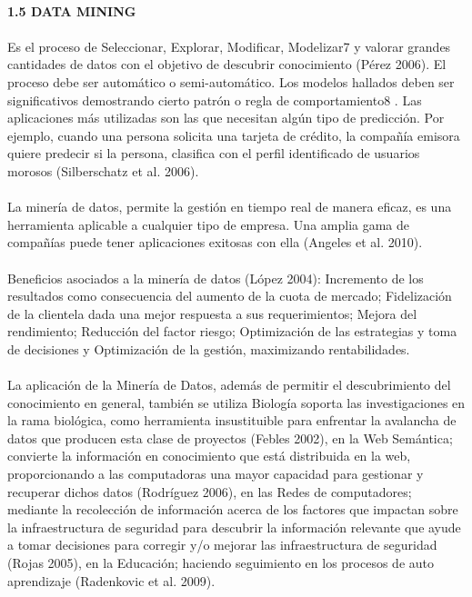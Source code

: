 \begin{flushleft}
\textbf{}\\
\textbf{1.5 DATA MINING }\\
\textbf{}\\
Es el proceso de Seleccionar, Explorar, Modificar, Modelizar7 y valorar grandes cantidades de datos con el objetivo de descubrir conocimiento (Pérez 2006). El proceso debe ser automático o semi-automático. Los modelos hallados deben ser significativos demostrando cierto patrón o regla de comportamiento8 . Las aplicaciones más utilizadas son las que necesitan algún tipo de predicción. Por ejemplo, cuando una persona solicita una tarjeta de crédito, la compañía emisora quiere predecir si la persona, clasifica con el perfil identificado de usuarios morosos (Silberschatz et al. 2006). \textbf{}\\
\textbf{}\\
La minería de datos, permite la gestión en tiempo real de manera eficaz, es una herramienta aplicable a cualquier tipo de empresa. Una amplia gama de compañías puede tener aplicaciones exitosas con ella (Angeles et al. 2010). \textbf{}\\
\textbf{}\\
Beneficios asociados a la minería de datos (López 2004): Incremento de los resultados como consecuencia del aumento de la cuota de mercado; Fidelización de la clientela dada una mejor respuesta a sus requerimientos; Mejora del rendimiento; Reducción del factor riesgo; Optimización de las estrategias y toma de decisiones y Optimización de la gestión, maximizando rentabilidades. \textbf{}\\
\textbf{}\\
La aplicación de la Minería de Datos, además de permitir el descubrimiento del conocimiento en general, también se utiliza Biología soporta las investigaciones en la rama biológica, como herramienta insustituible para enfrentar la avalancha de datos que producen esta clase de proyectos (Febles 2002), en la Web Semántica; convierte la información en conocimiento que está distribuida en la web, proporcionando a las computadoras una mayor capacidad para gestionar y recuperar dichos datos (Rodríguez 2006), en las Redes de computadores; mediante la recolección de información acerca de los factores que impactan sobre la infraestructura de seguridad para descubrir la información relevante que ayude a tomar decisiones para corregir y/o mejorar las infraestructura de seguridad (Rojas 2005), en la Educación; haciendo seguimiento en los procesos de auto aprendizaje (Radenkovic et al. 2009).



\end{flushleft}
